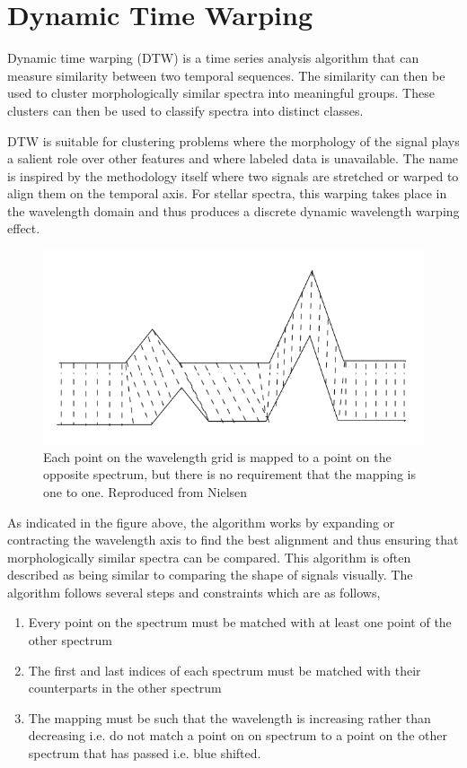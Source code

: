 \section{Dynamic Time Warping}

Dynamic time warping (DTW) is a time series analysis algorithm that can measure similarity between two temporal sequences. The similarity can then be used to cluster morphologically similar spectra into meaningful groups. These clusters can then be used to classify spectra into distinct classes. 

DTW is suitable for clustering problems where the morphology of the signal plays a salient role over other features \cite{nielsen2019practical} and where labeled data is unavailable. The name is inspired by the methodology itself where two signals are stretched or warped to align them on the temporal axis. For stellar spectra, this warping takes place in the wavelength domain and thus produces a discrete dynamic wavelength warping effect.

\begin{figure}[!htb]
\centering
\includegraphics[scale=1]{figures/Dynamic_time_warping.png}
\caption{Each point on the wavelength grid is mapped to a point on the opposite spectrum, but there is no requirement that the mapping is one to one. Reproduced from Nielsen \cite{nielsen2019practical}}
\end{figure}

As indicated in the figure above, the algorithm works by expanding or contracting the wavelength axis to find the best alignment and thus ensuring that morphologically similar spectra can be compared. This algorithm is often described as being similar to comparing the shape of signals visually. The algorithm follows several steps and constraints which are as follows,

\begin{enumerate}
    \item Every point on the spectrum must be matched with at least one point of the other spectrum
    \item The first and last indices of each spectrum must be matched with their counterparts in the other spectrum
    \item The mapping must be such that the wavelength is increasing rather than decreasing i.e. do not match a point on on spectrum to a point on the other spectrum that has passed i.e. blue shifted. 
\end{enumerate}

